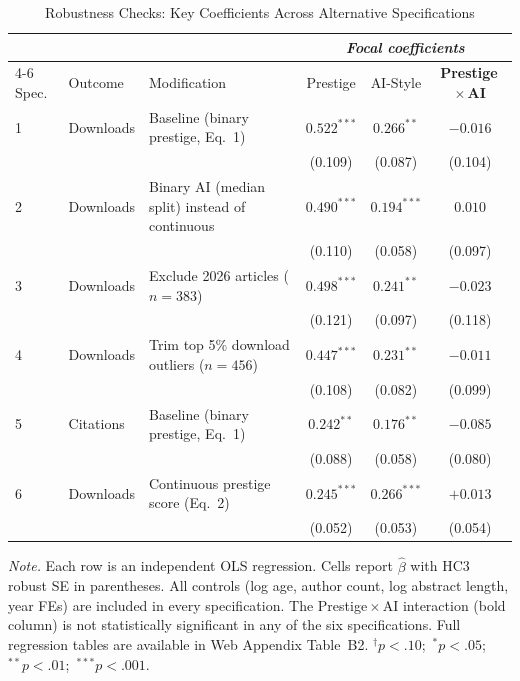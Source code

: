 \documentclass[12pt,a4paper]{article}
\begin{document}
\begin{table}[htbp]
\centering
\caption{Robustness Checks: Key Coefficients Across Alternative Specifications}
\label{tab:robustness}
\begin{threeparttable}
\small
\begin{tabular}{lllccc}
\toprule
 & & & \multicolumn{3}{c}{\textit{Focal coefficients}} \\
\cmidrule(lr){4-6}
Spec. & Outcome & Modification
  & Prestige & AI-Style & \textbf{Prestige\,$\times$\,AI} \\
\midrule
1 & Downloads & Baseline (binary prestige, Eq.~1)
  & $0.522^{***}$ & $0.266^{**}$  & $-0.016$ \\
  &           &
  & (0.109)       & (0.087)       & (0.104)  \\[4pt]
2 & Downloads & Binary AI (median split) instead of continuous
  & $0.490^{***}$ & $0.194^{***}$ & $0.010$  \\
  &           &
  & (0.110)       & (0.058)       & (0.097)  \\[4pt]
3 & Downloads & Exclude 2026 articles ($n = 383$)
  & $0.498^{***}$ & $0.241^{**}$  & $-0.023$ \\
  &           &
  & (0.121)       & (0.097)       & (0.118)  \\[4pt]
4 & Downloads & Trim top 5\% download outliers ($n=456$)
  & $0.447^{***}$ & $0.231^{**}$  & $-0.011$ \\
  &           &
  & (0.108)       & (0.082)       & (0.099)  \\[4pt]
5 & Citations & Baseline (binary prestige, Eq.~1)
  & $0.242^{**}$  & $0.176^{**}$  & $-0.085$ \\
  &           &
  & (0.088)       & (0.058)       & (0.080)  \\[4pt]
6 & Downloads & Continuous prestige score (Eq.~2)
  & $0.245^{***}$ & $0.266^{***}$ & $+0.013$ \\
  &           &
  & (0.052)       & (0.053)       & (0.054)  \\[4pt]
\bottomrule
\end{tabular}
\begin{tablenotes}
\footnotesize
\item \textit{Note.} Each row is an independent OLS regression.
  Cells report $\hat{\beta}$ with HC3 robust SE in parentheses.
  All controls (log age, author count, log abstract length, year FEs)
  are included in every specification.
  The Prestige\,$\times$\,AI interaction (bold column) is not statistically
  significant in any of the six specifications.
  Full regression tables are available in Web Appendix Table~B2.
  $^{\dagger}p<.10$;\ $^{*}p<.05$;\ $^{**}p<.01$;\ $^{***}p<.001$.
\end{tablenotes}
\end{threeparttable}
\end{table}
\end{document}
